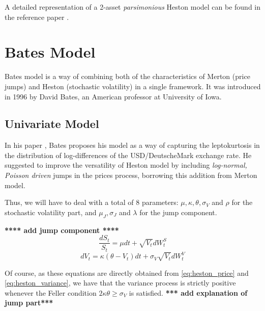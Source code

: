 A detailed representation of a 2-asset \textit{parsimonious} Heston model can be found in the reference paper \cite{PARSIMONIOUS2011}.

\section{Bates Model}
Bates model is a way of combining both of the characteristics of Merton (price jumps) and Heston (stochastic volatility) in a single framework.  It was introduced in 1996 by David Bates, an American professor at University of Iowa.

\subsection{Univariate Model}
In his paper \cite{BATES96}, Bates proposes his model as a way of capturing the leptokurtosis in the distribution of log-differences of the USD/DeutscheMark exchange rate. He suggested to improve the versatility of Heston model by including \textit{log-normal, Poisson driven} jumps in the prices process, borrowing this addition from Merton model.

Thus, we will have to deal with a total of 8 parameters: $\mu, \kappa, \theta, \sigma_V$ and $ \rho$ for the stochastic volatility part, and $ \mu_J, \sigma_J$ and $ \lambda$ for the jump component. 


\textbf{**** add jump component ****}
\begin{equation}
\frac{dS_t}{S_t} = \mu dt +\sqrt{ V_t} dW_t^S
\end{equation}
\begin{equation}
dV_t = \kappa (\theta - V_t) dt + \sigma_V \sqrt{V_t} dW_t^V
\end{equation}

Of course, as these equations are directly obtained from \eqref{eq:heston_price} and \eqref{eq:heston_variance}, we have that the variance process is strictly positive whenever the Feller condition $2\kappa\theta\geq \sigma_V$ is satisfied.
\textbf{*** add explanation of jump part***}

